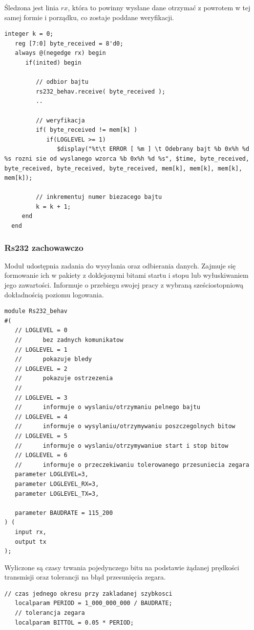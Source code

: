 \documentclass[a4paper,12pt]{article}
\begin{document}
Śledzona jest linia $rx$, która to powinny wysłane dane otrzymać z powrotem w tej samej formie i porządku, co zostaje poddane weryfikacji.
\begin{lstlisting}[label=sim/Rs232,caption=sim/Rs232.v,firstnumber=64]
   integer k = 0;
   reg [7:0] byte_received = 8'd0;
   always @(negedge rx) begin
      if(inited) begin

         // odbior bajtu
         rs232_behav.receive( byte_received );
         ..

         // weryfikacja
         if( byte_received != mem[k] )
            if(LOGLEVEL >= 1)
               $display("%t\t ERROR [ %m ] \t Odebrany bajt %b 0x%h %d %s rozni sie od wyslanego wzorca %b 0x%h %d %s", $time, byte_received, byte_received, byte_received, byte_received, mem[k], mem[k], mem[k], mem[k]);

         // inkrementuj numer biezacego bajtu
         k = k + 1;
     end
  end
\end{lstlisting}


\subsubsection{Rs232 zachowawczo}

Moduł udostępnia zadania do wysyłania oraz odbierania danych. Zajmuje się formowanie ich w pakiety z doklejonymi bitami startu i stopu lub wyłuskiwaniem jego zawartości. Informuje o przebiegu swojej pracy z wybraną sześciostopniową dokładnością poziomu logowania.
\begin{lstlisting}[label=sim/Rs232 behav,caption=sim/Rs232 behav.v]
module Rs232_behav
#(
   // LOGLEVEL = 0
   //      bez zadnych komunikatow
   // LOGLEVEL = 1
   //      pokazuje bledy
   // LOGLEVEL = 2
   //      pokazuje ostrzezenia
   //
   // LOGLEVEL = 3
   //      informuje o wyslaniu/otrzymaniu pelnego bajtu
   // LOGLEVEL = 4
   //      informuje o wysylaniu/otrzymywaniu poszczegolnych bitow
   // LOGLEVEL = 5
   //      informuje o wyslaniu/otrzymywaniue start i stop bitow
   // LOGLEVEL = 6
   //      informuje o przeczekiwaniu tolerowanego przesuniecia zegara
   parameter LOGLEVEL=3,
   parameter LOGLEVEL_RX=3,
   parameter LOGLEVEL_TX=3,

   parameter BAUDRATE = 115_200
) (
   input rx,
   output tx
);
\end{lstlisting}

Wyliczone są czasy trwania pojedynczego bitu na podstawie żądanej prędkości transmisji oraz tolerancji na błąd przesunięcia zegara.
\begin{lstlisting}[label=sim/Rs232 behav,caption=sim/Rs232 behav.v,firstnumber=64]
   // czas jednego okresu przy zakladanej szybkosci
   localparam PERIOD = 1_000_000_000 / BAUDRATE;
   // tolerancja zegara
   localparam BITTOL = 0.05 * PERIOD;
\end{lstlisting}
\end{document}
